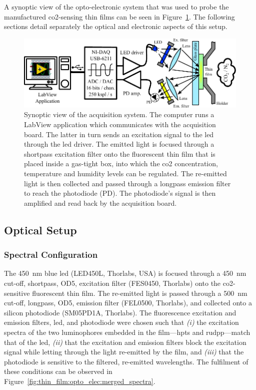 A synoptic view of the opto-electronic system that was used to probe the manufactured \gls{co2}-sensing thin films can be seen in Figure~\ref{fig:thin_film:opto_elec:synoptic}. The following sections detail separately the optical and electronic aspects of this setup.

\begin{figure}
	\includegraphics{1_main_matter/thin_film_figures/optoelectronics/synoptic}
	\caption[Synoptic view of the acquisition system.]{Synoptic view of the acquisition system. The computer runs a LabView application which communicates with the acquisition board. The latter in turn sends an excitation signal to the \gls{led} through the \gls{led} driver. The emitted light is focused through a shortpass excitation filter onto the fluorescent thin film that is placed inside a gas-tight box, into which the \gls{co2} concentration, temperature and humidity levels can be regulated. The re-emitted light is then collected and passed through a longpass emission filter to reach the photodiode (PD). The photodiode's signal is then amplified and read back by the acquisition board.}
	\label{fig:thin_film:opto_elec:synoptic}
\end{figure}

\subsection{Optical Setup}

\subsubsection{Spectral Configuration}

The 450~nm blue \gls{led} (LED450L, Thorlabs, USA) is focused through a 450~nm cut-off, shortpass, OD5, excitation filter (FES0450, Thorlabs) onto the \gls{co2}-sensitive fluorescent thin film. The re-emitted light is passed through a 500~nm cut-off, longpass, OD5, emission filter (FEL0500, Thorlabs), and collected onto a silicon photodiode (SM05PD1A, Thorlabs). The fluorescence excitation and emission filters, \gls{led}, and photodiode were chosen such that \textit{(i)} the excitation spectra of the two luminophores embedded in the film---\gls{hpts} and \gls{rudpp}---match that of the \gls{led}, \textit{(ii)} that the excitation and emission filters block the excitation signal while letting through the light re-emitted by the film, and \textit{(iii)} that the photodiode is sensitive to the filtered, re-emitted wavelengths. The fulfilment of these conditions can be observed in Figure~\ref{fig:thin_film:opto_elec:merged_spectra}.


